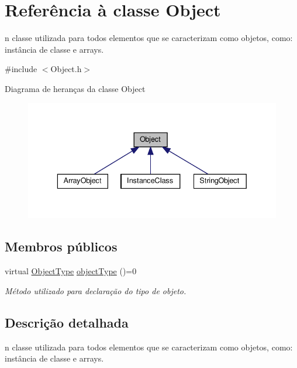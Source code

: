\hypertarget{classObject}{}\section{Referência à classe Object}
\label{classObject}


n classe utilizada para todos elementos que se caracterizam como objetos, como\+: instância de classe e arrays.  




{\ttfamily \#include $<$Object.\+h$>$}



Diagrama de heranças da classe Object
\nopagebreak
\begin{figure}[H]
\begin{center}
\leavevmode
\includegraphics[width=336pt]{classObject__inherit__graph}
\end{center}
\end{figure}
\subsection*{Membros públicos}
\begin{DoxyCompactItemize}
\item 
virtual \hyperlink{BasicTypes_8h_a842c5e2e69277690b064bf363c017980}{Object\+Type} \hyperlink{classObject_a08cee945bc224fc81f4448086625183d}{object\+Type} ()=0
\begin{DoxyCompactList}\small\item\em Método utilizado para declaração do tipo de objeto. \end{DoxyCompactList}\end{DoxyCompactItemize}


\subsection{Descrição detalhada}
n classe utilizada para todos elementos que se caracterizam como objetos, como\+: instância de classe e arrays. 

